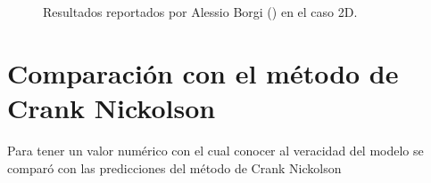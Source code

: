 \documentclass[
  spanish,
  us-letterpaper,
  DIV=11,
  numbers=noendperiod]{scrreprt}
\theoremstyle{definition}
\theoremstyle{plain}
\theoremstyle{remark}
\begin{document}
\begin{figure}


\caption{\label{fig-results_fnn}Resultados reportados por Alessio Borgi
() en el caso 2D.}

\end{figure}%

\section{Comparación con el método de Crank
Nickolson}\label{comparaciuxf3n-con-el-muxe9todo-de-crank-nickolson}

Para tener un valor numérico con el cual conocer al veracidad del modelo
se comparó con las predicciones del método de Crank Nickolson
\end{document}
